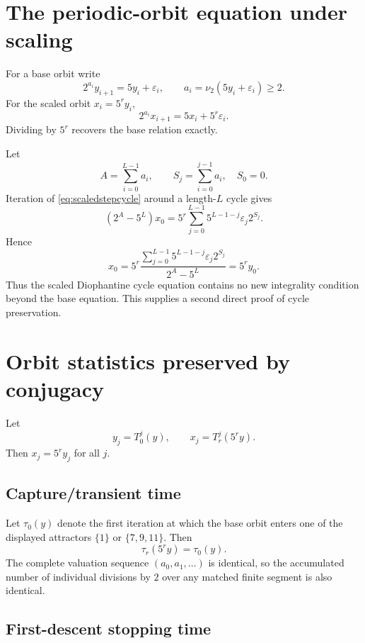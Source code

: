 \documentclass[11pt]{article}
\theoremstyle{remark}
\newcommand{\vTwo}{\nu_2}
\newcommand{\eps}{\varepsilon}
\begin{document}
\section{The periodic-orbit equation under scaling}

For a base orbit write
\[
2^{a_i}y_{i+1}=5y_i+\eps_i,
\qquad
a_i=\vTwo(5y_i+\eps_i)\ge2.
\]
For the scaled orbit $x_i=5^ry_i$,
\begin{equation}
2^{a_i}x_{i+1}=5x_i+5^r\eps_i.
\label{eq:scaledstepcycle}
\end{equation}
Dividing by $5^r$ recovers the base relation exactly.

Let
\[
A=\sum_{i=0}^{L-1}a_i,\qquad
S_j=\sum_{i=0}^{j-1}a_i,\quad S_0=0.
\]
Iteration of \eqref{eq:scaledstepcycle} around a length-$L$ cycle gives
\begin{equation}
(2^A-5^L)x_0
=
5^r\sum_{j=0}^{L-1}5^{L-1-j}\eps_j2^{S_j}.
\label{eq:scaledcycleidentity}
\end{equation}
Hence
\begin{equation}
x_0
=
5^r
\frac{\displaystyle\sum_{j=0}^{L-1}5^{L-1-j}\eps_j2^{S_j}}
{\displaystyle 2^A-5^L}
=5^ry_0.
\label{eq:scaledcycleclosed}
\end{equation}
Thus the scaled Diophantine cycle equation contains no new integrality condition beyond the base equation.  This supplies a second direct proof of cycle preservation.

\section{Orbit statistics preserved by conjugacy}

Let
\[
y_j=T_0^j(y),\qquad x_j=T_r^j(5^ry).
\]
Then $x_j=5^ry_j$ for all $j$.

\subsection{Capture/transient time}

Let $\tau_0(y)$ denote the first iteration at which the base orbit enters one of the displayed attractors $\{1\}$ or $\{7,9,11\}$.  Then
\begin{equation}
\tau_r(5^ry)=\tau_0(y).
\label{eq:capturetime}
\end{equation}
The complete valuation sequence $(a_0,a_1,\ldots)$ is identical, so the accumulated number of individual divisions by $2$ over any matched finite segment is also identical.

\subsection{First-descent stopping time}
\end{document}

